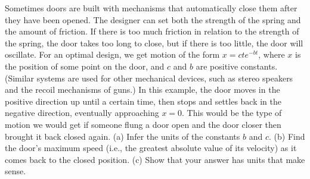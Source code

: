 Sometimes doors are built with mechanisms that automatically close them after
they have been opened. The designer can set both the strength of the spring
and the amount of friction. If there is too much friction in relation to the strength of the spring, the door takes
too long to close, but if there is too little, the door will oscillate.
For an optimal design, we get motion of the form $x=ct e^{-bt}$, where $x$ is the position of some point on the door,
and $c$ and $b$ are positive constants. (Similar systems are used for other mechanical devices, such as stereo
speakers and the recoil mechanisms of guns.) In this example, the door moves in the positive direction up until
a certain time, then stops and settles back in the negative direction, eventually approaching $x=0$. This would be
the type of motion we would get if someone flung a door open and the door closer then brought it back closed again.
(a) Infer the units of the constants $b$ and $c$.\hwendpart
(b) Find the door's maximum speed (i.e., the greatest absolute value of its velocity) as it 
comes back to the closed position.\answercheck\hwendpart
(c) Show that your answer has units that make sense.

